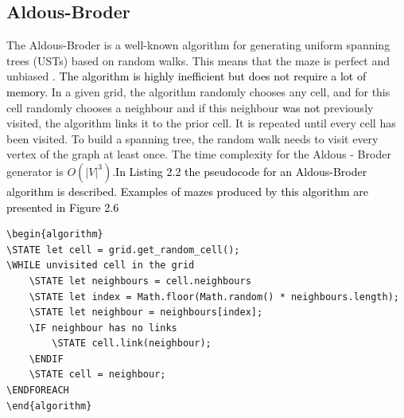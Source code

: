 \subsection{Aldous-Broder}
The Aldous-Broder is a well-known algorithm for generating uniform spanning trees (USTs) based on random walks. This means that the maze is perfect and unbiased \cite{17}. \textcolor{black}{The algorithm is highly inefficient but does not require a lot of memory.} In a given grid, the algorithm randomly chooses any cell, and for this cell randomly chooses a neighbour and if this neighbour \textcolor{black}{was not} previously visited, the algorithm links it to the prior cell. It is repeated until every cell has been visited. To build a spanning tree, the random walk needs to visit every vertex of the graph at least once. The time complexity for the Aldous - Broder generator is $O(|V|^3)$.\textcolor{black}{In Listing 2.2 the pseudocode for an Aldous-Broder algorithm is described. Examples of mazes produced by this algorithm are presented in Figure 2.6}
\newline
\begin{lstlisting}[caption={Pseudocode for an Aldous-Broder algorithm}]
\begin{algorithm}
\STATE let cell = grid.get_random_cell();
\WHILE unvisited cell in the grid
	\STATE let neighbours = cell.neighbours
	\STATE let index = Math.floor(Math.random() * neighbours.length);
	\STATE let neighbour = neighbours[index];
	\IF neighbour has no links
		\STATE cell.link(neighbour);
	\ENDIF
	\STATE cell = neighbour;
\ENDFOREACH
\end{algorithm}
\end{lstlisting}

